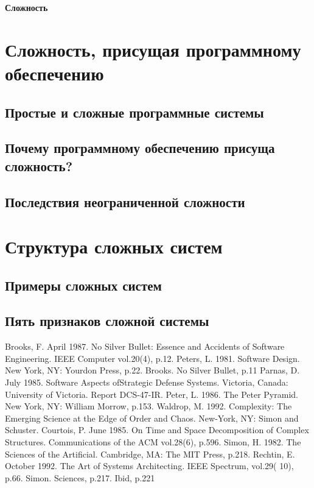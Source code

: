 \documentclass[11pt,a4paper]{article}
\begin{document}
\begin{center}
\huge{\textbf{Сложность}}
\end{center}
\section[14pt]{Сложность, присущая программному обеспечению}
\subsection[13pt]{Простые и сложные программные системы}
\subsection[13pt]{Почему программному обеспечению присуща сложность?}


\subsection[13pt]{Последствия неограниченной сложности}
 

\section[14pt]{Структура сложных систем}
\subsection{Примеры сложных систем }


\subsection{Пять признаков сложной системы }


\begin{thebibliography}{}
     Brooks, F. April 1987. No Silver Bullet: Essence and Accidents of Software Engineering. IEEE Computer vol.20(4), p.12. 
     Peters, L. 1981. Software Design. New York, NY: Yourdon Press, p.22. 
     Brooks. No Silver Bullet, p.11
     Parnas, D. July 1985. Software Aspects ofStrategic Defense Systems. Victoria, Canada: University of Victoria. Report DCS-47-IR. 
     Peter, L. 1986. The Peter Pyramid. New York, NY: William Morrow, p.153. 
     Waldrop, M. 1992. Complexity: The Emerging Science at the Edge of Order and Chaos. New-York, NY: Simon and Schuster. 
     Courtois, P. June 1985. On Time and Space Decomposition of Complex Structures. Communications of the ACM vol.28(6), p.596. 
     Simon, H. 1982. The Sciences of the Artificial. Cambridge, MA: The MIT Press, p.218. 
     Rechtin, E. October 1992. The Art of Systems Architecting. IEEE Spectrum, vol.29( 10), p.66. 
     Simon. Sciences, p.217. 
     Ibid, p.221
\end{thebibliography}
\end{document}
